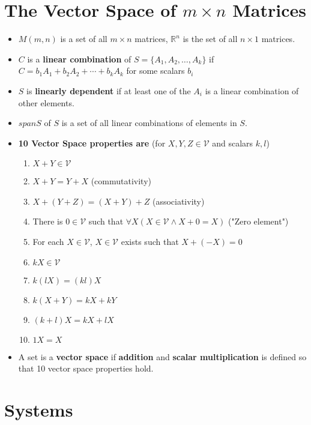
\section{The Vector Space of \texorpdfstring{$m \times n$}{m x n} Matrices}

\begin{itemize}
  \item $M(m, n)$ is a set of all $m \times n$ matrices, $\mathbb{R}^n$ is the set of all $n \times 1$ matrices.
  \item $C$ is a \textbf{linear combination} of $S = \{ A_1, A_2, \ldots, A_k \}$ if $C = b_1 A_1 + b_2 A_2 + \cdots + b_k A_k$ for some scalars $b_i$
  \item $S$ is \textbf{linearly dependent} if at least one of the $A_i$ is a linear combination of other elements.
  \item $span S$ of $S$ is a set of all linear combinations of elements in $S$.
  \item \textbf{10 Vector Space properties are} (for $X, Y, Z \in \mathcal{V}$ and scalars $k, l$)
    \begin{enumerate}
      \item $X + Y \in \mathcal{V}$
      \item $X + Y = Y + X$ (commutativity)
      \item $X + (Y + Z) = (X + Y) + Z$ (associativity)
      \item There is $0 \in \mathcal{V}$ such that $\forall X (X \in \mathcal{V} \land X + 0 = X)$ ("Zero element")
      \item For each $X \in \mathcal{V}$, $X \in \mathcal{V}$ exists such that $X + (-X) = 0$
      \item $k X \in \mathcal{V}$
      \item $k(lX) = (kl) X$
      \item $k (X + Y) = kX + kY$
      \item $(k + l)X = kX + lX$
      \item $1X = X$
    \end{enumerate}
  \item A set is a \textbf{vector space} if \textbf{addition} and \textbf{scalar multiplication} is defined so that 10 vector space properties hold.
\end{itemize}

\section{Systems}

